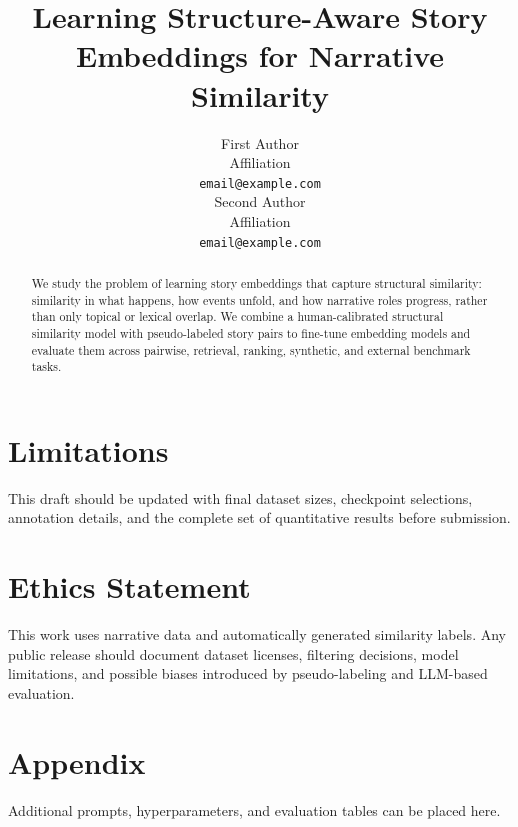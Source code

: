 \documentclass[11pt]{article}
\title{Learning Structure-Aware Story Embeddings for Narrative Similarity}
\author{First Author \\
  Affiliation \\
  \texttt{email@example.com} \\
  \And
  Second Author \\
  Affiliation \\
  \texttt{email@example.com}}
\begin{document}
\maketitle

\begin{abstract}
We study the problem of learning story embeddings that capture structural similarity: similarity in what happens, how events unfold, and how narrative roles progress, rather than only topical or lexical overlap. We combine a human-calibrated structural similarity model with pseudo-labeled story pairs to fine-tune embedding models and evaluate them across pairwise, retrieval, ranking, synthetic, and external benchmark tasks.
\end{abstract}










\section*{Limitations}
This draft should be updated with final dataset sizes, checkpoint selections, annotation details, and the complete set of quantitative results before submission.

\section*{Ethics Statement}
This work uses narrative data and automatically generated similarity labels. Any public release should document dataset licenses, filtering decisions, model limitations, and possible biases introduced by pseudo-labeling and LLM-based evaluation.

\nocite{placeholder}


\appendix
\section{Appendix}
Additional prompts, hyperparameters, and evaluation tables can be placed here.
\end{document}
